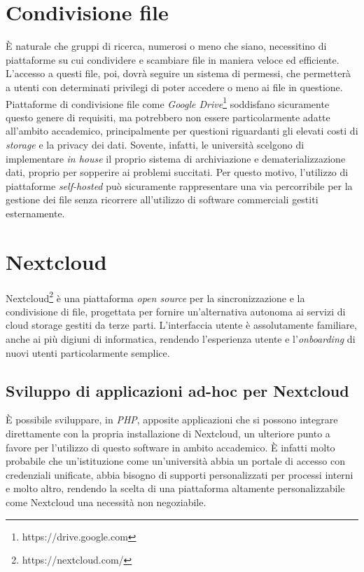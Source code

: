 \section{Condivisione file}
È naturale che gruppi di ricerca, numerosi o meno che siano, necessitino di piattaforme su cui condividere e scambiare file in maniera veloce ed efficiente. L'accesso a questi file, poi, dovrà seguire un sistema di permessi, che permetterà a utenti con determinati privilegi di poter accedere o meno ai file in questione.\newline
Piattaforme di condivisione file come \textit{Google Drive}\footnote{https://drive.google.com} soddisfano sicuramente questo genere di requisiti, ma potrebbero non essere particolarmente adatte all'ambito accademico, principalmente per questioni riguardanti gli elevati costi di \textit{storage} e la privacy dei dati.
\newline
Sovente, infatti, le università scelgono di implementare \textit{in house} il proprio sistema di archiviazione e dematerializzazione dati, proprio per sopperire ai problemi succitati. Per questo motivo, l'utilizzo di piattaforme \textit{self-hosted} può sicuramente rappresentare una via percorribile per la gestione dei file senza ricorrere all'utilizzo di software commerciali gestiti esternamente.

\section{Nextcloud}
Nextcloud\footnote{https://nextcloud.com/} è una piattaforma \textit{open source} per la sincronizzazione e la condivisione di file, progettata per fornire un'alternativa autonoma ai servizi di cloud storage gestiti da terze parti. L'interfaccia utente è assolutamente familiare, anche ai più digiuni di informatica, rendendo l'esperienza utente e l'\textit{onboarding} di nuovi utenti particolarmente semplice.

\subsection{Sviluppo di applicazioni {ad-hoc} per Nextcloud}
È possibile sviluppare, in \textit{PHP}, apposite applicazioni che si possono integrare direttamente con la propria installazione di Nextcloud, un ulteriore punto a favore per l'utilizzo di questo software in ambito accademico.
\newline
È infatti molto probabile che un'istituzione come un'università abbia un portale di accesso con credenziali unificate, abbia bisogno di supporti personalizzati per processi interni e molto altro, rendendo la scelta di una piattaforma altamente personalizzabile come Nextcloud una necessità non negoziabile. 

